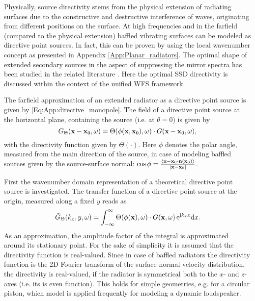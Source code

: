 Physically, source directivity stems from the physical extension of radiating surfaces due to the constructive and destructive interference of waves, originating from different positions on the surface.
At high frequencies and in the farfield (compared to the physical extension) baffled vibrating surfaces can be modeled as directive point sources.
In fact, this can be proven by using the local wavenumber concept as presented in Appendix \ref{App:Planar_radiators}.
The optimal shape of extended secondary sources in the aspect of suppressing the mirror spectra has been studied in the related literature \cite{Verheijen1997:phd}.
Here the optimal SSD directivity is discussed within the context of the unified WFS framework.

The farfield approximation of an extended radiator as a directive point source is given by \eqref{Eq:App:directive_monopole}.
The field of a directive point source at the horizontal plane, containing the source (i.e. at $\theta = 0$) is given by
\begin{equation}
G_{\Theta}(\mathbf{x}-\mathbf{x}_0,\omega) = \Theta(\phi(\mathbf{x},\mathbf{x}_0),\omega) \cdot
G(\mathbf{x}-\mathbf{x}_0,\omega),
\end{equation}
with the directivity function given by $\Theta(\cdot)$. 
Here $\phi$ denotes the polar angle, measured from the main direction of the source, in case of modeling baffled sources given by the source-surface normal: $\cos \phi = \frac{\left< \mathbf{x}-\mathbf{x}_0 \cdot \mathbf{n}(\mathbf{x}_0) \right>}{|\mathbf{x}-\mathbf{x}_0|}$.

First the wavenumber domain representation of a theoretical directive point source is investigated.
The transfer function of a directive point source at the origin, measured along a fixed $y$ reads as 
\begin{equation}
\tilde{G}_{\Theta}(k_x,y,\omega) = \int_{-\infty}^{\infty} \Theta(\phi(\mathbf{x}),\omega) \cdot
G(\mathbf{x},\omega) \, \mathrm{e}^{\mathrm{j} k_x x} \mathrm{d} x.
\end{equation}
As an approximation, the amplitude factor of the integral is approximated around its stationary point.
For the sake of  simplicity it is assumed that the directivity function is real-valued.
Since in case of baffled radiators the directivity function is the 2D Fourier transform of the surface normal velocity distribution, the directivity is real-valued, if the radiator is symmetrical both to the $x$- and $z$-axes (i.e. its is even function).
This holds for simple geometries, e.g. for a circular piston, which model is applied frequently for modeling a dynamic loudspeaker.

